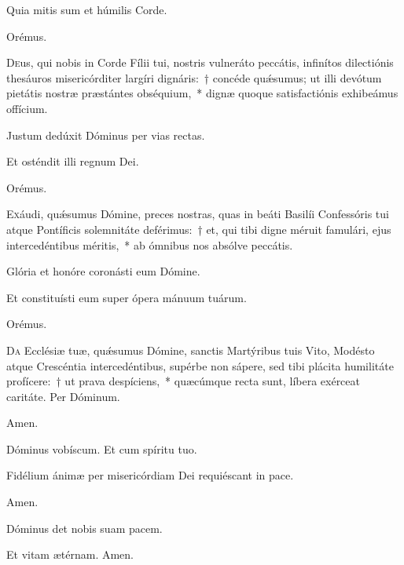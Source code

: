 \rr Quia mitis sum et húmilis Corde.

  Orémus.
  
  \lettrine{D}{e}us, qui nobis in Corde Fílii tui, nostris vulneráto peccátis, infinítos dilectiónis thesáuros misericórditer largíri dignáris:~† concéde quǽsumus; ut illi devótum pietátis nostræ præstántes obséquium,~* dignæ quoque satisfactiónis exhibeámus offícium.
  
  
  \vv Justum dedúxit Dóminus per vias rectas.
  
\rr Et osténdit illi regnum Dei.

Orémus.

\lettrine{E}{x}áudi, quǽsumus Dómine, preces nostras, quas in beáti Basilíi Confessóris tui atque Pontíficis solemnitáte deférimus:~† et, qui tibi digne méruit famulári, ejus intercedéntibus méritis,~* ab ómnibus nos absólve peccátis.

\newpage

\vv Glória et honóre coronásti eum Dómine.

\rr Et constituísti eum super ópera mánuum tuárum.

Orémus.

\lettrine{D}{a} Ecclésiæ tuæ, quǽsumus Dómine, sanctis Martýribus tuis Vito, Modésto atque Crescéntia intercedéntibus, supérbe non sápere, sed tibi plácita humilitáte profícere:~† ut prava despíciens,~* quæcúmque recta sunt, líbera exérceat caritáte. Per Dóminum.

\rr Amen.

   \vv Dóminus vobíscum. \rr Et cum spíritu tuo.
   
   
  \vv Fidélium ánimæ per misericórdiam Dei requiéscant in pace.
  
  \rr Amen.
  
  
  \secreto
  
\vv Dóminus det nobis suam pacem.
  
\rr Et vitam ætérnam. Amen.

